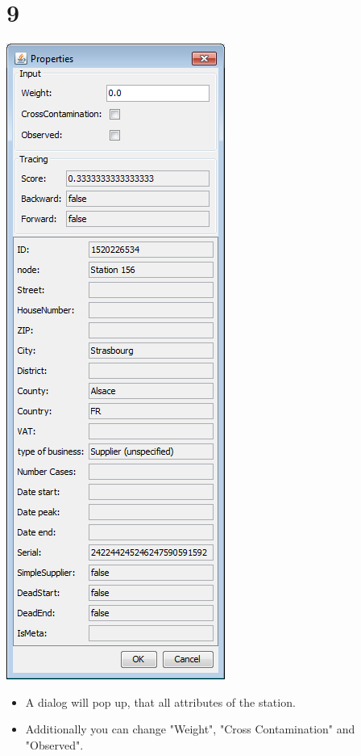 \documentclass{beamer}
\begin{document}
\section{9}
\begin{frame}
	\begin{center}
  		\includegraphics[height=0.6\textheight]{9.png}
	\end{center}
	\begin{itemize}
		\item A dialog will pop up, that all attributes of the station.
		\item Additionally you can change "Weight", "Cross Contamination" and "Observed".		
	\end{itemize}
\end{frame}
\end{document}
